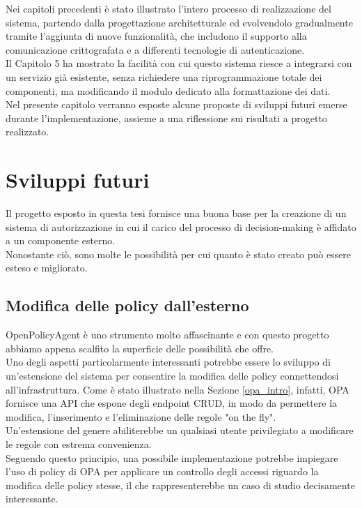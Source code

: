 Nei capitoli precedenti è stato illustrato l'intero processo di realizzazione del sistema, partendo dalla
progettazione architetturale ed evolvendolo gradualmente tramite l'aggiunta di nuove funzionalità, che includono il supporto alla comunicazione crittografata 
e a differenti tecnologie di autenticazione. 
\\ Il Capitolo 5 ha mostrato la facilità 
con cui questo sistema riesce a integrarsi con un servizio già esistente, senza richiedere una 
riprogrammazione totale dei componenti, ma modificando il modulo dedicato alla formattazione dei dati. 
\\ Nel presente capitolo verranno esposte alcune proposte di sviluppi futuri emerse durante l'implementazione, assieme a una riflessione
 sui risultati a progetto realizzato. 

\section{Sviluppi futuri}
Il progetto esposto in questa tesi fornisce una buona base per la creazione di un sistema di autorizzazione 
in cui il carico del processo di decision-making è affidato a un componente esterno.  
\\ Nonostante ciò, sono molte le possibilità per cui quanto è stato creato può essere esteso e migliorato. 

\subsection{Modifica delle policy dall'esterno}
OpenPolicyAgent è uno strumento molto affascinante e con questo progetto abbiamo 
appena scalfito la superficie delle possibilità che offre. \\ Uno degli aspetti particolarmente interessanti 
potrebbe essere lo sviluppo di un'estensione del sistema per consentire la modifica delle policy connettendosi all'infrastruttura. 
Come è stato illustrato nella Sezione \ref*{opa_intro}, infatti, OPA fornisce una API che espone degli 
endpoint CRUD, in modo da permettere la modifica, l'inserimento e l'eliminazione delle regole "on the fly".
\\Un'estensione del genere abiliterebbe un qualsiasi utente privilegiato a modificare le regole con estrema
 convenienza.   
\\ Seguendo questo principio, una possibile implementazione potrebbe impiegare l'uso di policy di OPA per applicare un controllo degli accessi 
riguardo la modifica delle policy stesse, il che rappresenterebbe un caso di studio decisamente interessante. 

